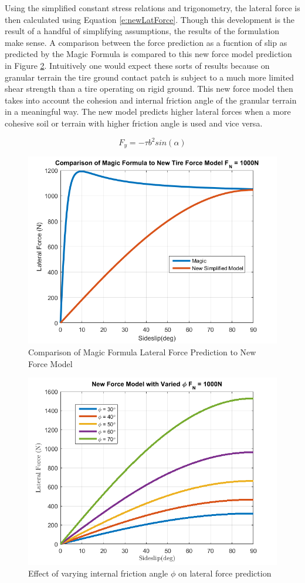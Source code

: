\documentclass[12pt,onecolumn]{report}
\begin{document}
Using the simplified constant stress relations and trigonometry, the lateral force is then calculated using Equation \ref{e:newLatForce}. Though this development is the result of a handful of simplifying assumptions, the results of the formulation make sense. A comparison between the force prediction as a fucntion of slip as predicted by the Magic Formula is compared to this new force model prediction in Figure \ref{fig:newForceComparison}. Intuitively one would expect these sorts of results because on granular terrain the tire ground contact patch is subject to a much more limited shear strength than a tire operating on rigid ground. This new force model then takes into account the cohesion and internal friction angle of the granular terrain in a meaningful way. The new model predicts higher lateral forces when a more cohesive soil or terrain with higher friction angle is used and vice versa. 

\begin{equation}\label{e:newLatForce}
F_y = -\tau b^2 sin\left(\alpha\right)
\end{equation}


\begin{figure}
	\centering
	\includegraphics[width=0.8\columnwidth]{Figs/forceComparison.png}
	\caption{\small Comparison of Magic Formula Lateral Force Prediction to New Force Model}  
	\label{fig:newForceComparison}
\end{figure}

\begin{figure}
	\centering
	\includegraphics[width=0.8\columnwidth]{Figs/variedPhi.png}
	\caption{\small Effect of varying internal friction angle $\phi$ on lateral force prediction}  
	\label{fig:newForceComparison}
\end{figure}
\end{document}
